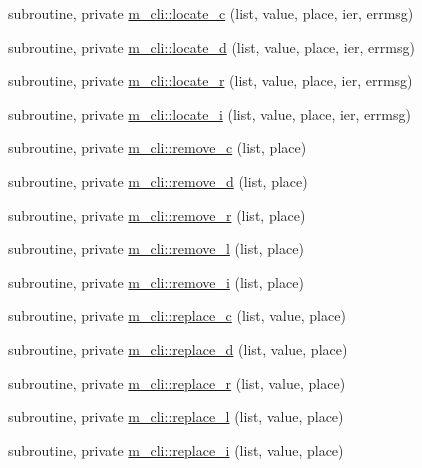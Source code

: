 \begin{DoxyCompactItemize}
\item 
subroutine, private \mbox{\hyperlink{namespacem__cli_ade3d1e36f0fc6a47b5469dcd8ade5312}{m\+\_\+cli\+::locate\+\_\+c}} (list, value, place, ier, errmsg)
\item 
subroutine, private \mbox{\hyperlink{namespacem__cli_a4187c24a2abf5cc630232965637493e8}{m\+\_\+cli\+::locate\+\_\+d}} (list, value, place, ier, errmsg)
\item 
subroutine, private \mbox{\hyperlink{namespacem__cli_ac44389e115b536069f324bffea7d2469}{m\+\_\+cli\+::locate\+\_\+r}} (list, value, place, ier, errmsg)
\item 
subroutine, private \mbox{\hyperlink{namespacem__cli_a36665ab0ea5080c14c8c9e52ed07d397}{m\+\_\+cli\+::locate\+\_\+i}} (list, value, place, ier, errmsg)
\item 
subroutine, private \mbox{\hyperlink{namespacem__cli_a05f549b10f50798d68003b8fd2a2d86a}{m\+\_\+cli\+::remove\+\_\+c}} (list, place)
\item 
subroutine, private \mbox{\hyperlink{namespacem__cli_abf22cbc2af66482f33b7bb1a210d9d99}{m\+\_\+cli\+::remove\+\_\+d}} (list, place)
\item 
subroutine, private \mbox{\hyperlink{namespacem__cli_a4f47701695b95c88fa4927c04996ce0f}{m\+\_\+cli\+::remove\+\_\+r}} (list, place)
\item 
subroutine, private \mbox{\hyperlink{namespacem__cli_a9c86f0f52ce71f14e774fd21f0686cf6}{m\+\_\+cli\+::remove\+\_\+l}} (list, place)
\item 
subroutine, private \mbox{\hyperlink{namespacem__cli_afa08d3d87184a6dd68a124231e536c93}{m\+\_\+cli\+::remove\+\_\+i}} (list, place)
\item 
subroutine, private \mbox{\hyperlink{namespacem__cli_a785aa0016768b6dc2e27c29d5342c329}{m\+\_\+cli\+::replace\+\_\+c}} (list, value, place)
\item 
subroutine, private \mbox{\hyperlink{namespacem__cli_aa9b7d672cc9fb0bc79fd09a2870614f5}{m\+\_\+cli\+::replace\+\_\+d}} (list, value, place)
\item 
subroutine, private \mbox{\hyperlink{namespacem__cli_ab3b33abc8a6da174d3f27c2f2203038c}{m\+\_\+cli\+::replace\+\_\+r}} (list, value, place)
\item 
subroutine, private \mbox{\hyperlink{namespacem__cli_a89ed5c3b944f91d8135173206fbc7e07}{m\+\_\+cli\+::replace\+\_\+l}} (list, value, place)
\item 
subroutine, private \mbox{\hyperlink{namespacem__cli_ac609c48bb1f904235b8cbf8bea61473f}{m\+\_\+cli\+::replace\+\_\+i}} (list, value, place)

\end{DoxyCompactItemize}
